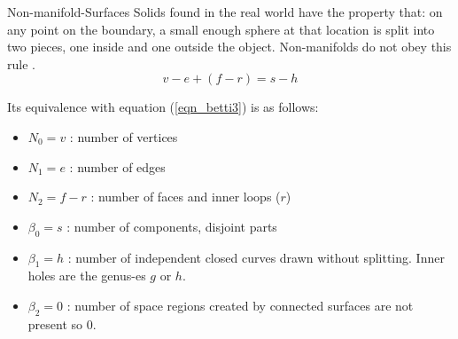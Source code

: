 \begin{frame}{Non-manifold-Surfaces}
Solids found in the real world have the property that: on any point on the boundary, a small enough sphere at that location is split into two pieces, one inside and one outside the object. Non-manifolds do not obey this rule \cite{Krishnamurti2002}.
\begin{equation}
v - e + (f - r) = s - h
\label{eqn_nonmanifold}
\end{equation}

Its equivalence with equation (\ref{eqn_betti3}) is as follows:

\begin{itemize}[noitemsep,label=\textbullet,topsep=2pt,parsep=2pt,partopsep=2pt]
\item $N_{0} = v$ : number of vertices
\item $N_{1} = e$ : number of edges
\item $N_{2} = f - r $ : number of faces and inner loops ($r$)
\item $\beta_{0} = s$ : number of components, disjoint parts
\item $\beta_{1} = h$ : number of independent closed curves drawn without splitting. Inner holes are the genus-es $g$ or $h$. 
\item $\beta_{2} = 0$ : number of space regions created by connected surfaces are not present so $0$.
\end{itemize}

\end{frame}


